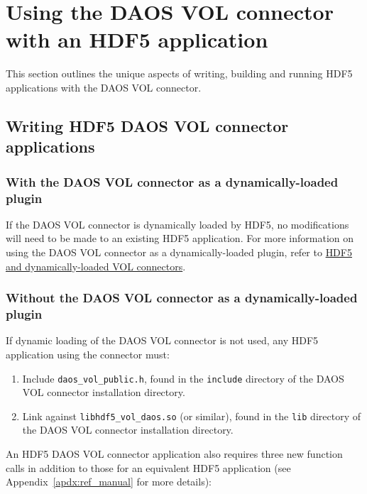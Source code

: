 
\section{Using the DAOS VOL connector with an HDF5 application}

This section outlines the unique aspects of writing, building and running HDF5 applications with the DAOS VOL connector.

\subsection{Writing HDF5 DAOS VOL connector applications}

\subsubsection{With the DAOS VOL connector as a dynamically-loaded plugin}

If the DAOS VOL connector is dynamically loaded by HDF5, no modifications will need to be made to an existing HDF5 application. For more information on using the DAOS VOL connector as a dynamically-loaded plugin, refer to \hyperref[hdf5:dynamically_loaded_connectors]{HDF5 and dynamically-loaded VOL connectors}.

\subsubsection{Without the DAOS VOL connector as a dynamically-loaded plugin}

If dynamic loading of the DAOS VOL connector is not used, any HDF5 application using the connector must:

\begin{enumerate}
    \item Include \texttt{daos\_vol\_public.h}, found in the \texttt{include} directory of the DAOS VOL connector installation directory.
    \item Link against \texttt{libhdf5\_vol\_daos.so} (or similar), found in the \texttt{lib} directory of the DAOS VOL connector installation directory.
\end{enumerate}

An HDF5 DAOS VOL connector application also requires three new function calls in addition to those for an equivalent HDF5 application (see Appendix~\ref{apdx:ref_manual} for more details):

